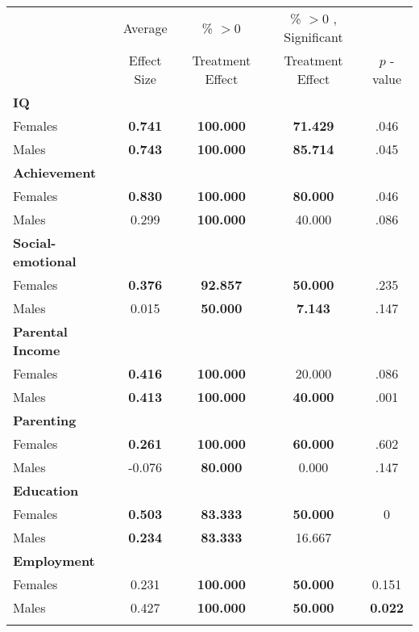 
\begin{tabular}{l c c c c}
\toprule
 & Average & \% $ >0 $ & \% $ >0 $ , Significant & \citet{Rosenbaum_2005_Distribution_JRSS} \\
 & Effect Size & Treatment Effect & Treatment Effect & $ p $ -value \\
\midrule
\textbf{IQ} & & & & \\
\quad Females &  \textbf{    0.741} & \textbf{  100.000} & \textbf{   71.429} & .046 \\
\quad Males &  \textbf{    0.743} & \textbf{  100.000} & \textbf{   85.714} & .045 \\
\midrule
\textbf{Achievement} & & & & \\
\quad Females &  \textbf{    0.830} & \textbf{  100.000} & \textbf{   80.000} & .046 \\
\quad Males &      0.299 & \textbf{  100.000} &    40.000 & .086 \\
\midrule
\textbf{Social-emotional} & & & & \\
\quad Females &  \textbf{    0.376} & \textbf{   92.857} & \textbf{   50.000} & .235 \\
\quad Males &      0.015 & \textbf{   50.000} & \textbf{    7.143} & .147 \\
\midrule
\textbf{Parental Income} & & & & \\
\quad Females &  \textbf{    0.416} & \textbf{  100.000} &    20.000 & .086 \\
\quad Males &  \textbf{    0.413} & \textbf{  100.000} & \textbf{   40.000} & .001 \\
\midrule
\textbf{Parenting} & & & & \\
\quad Females &  \textbf{    0.261} & \textbf{  100.000} & \textbf{   60.000} & .602 \\
\quad Males &     -0.076 & \textbf{   80.000} &     0.000 & .147 \\
\midrule
\textbf{Education} & & & & \\
\quad Females &  \textbf{    0.503} & \textbf{   83.333} & \textbf{   50.000} & 0 \\
\quad Males &  \textbf{    0.234} & \textbf{   83.333} &    16.667 &  \textbf{ 0.235 \\
\midrule
\textbf{Employment} & & & & \\
\quad Females &      0.231 & \textbf{  100.000} & \textbf{   50.000} &  0.151\\
\quad Males &      0.427 & \textbf{  100.000} & \textbf{   50.000} &  \textbf{ 0.022} \\
}
\end{tabular}
